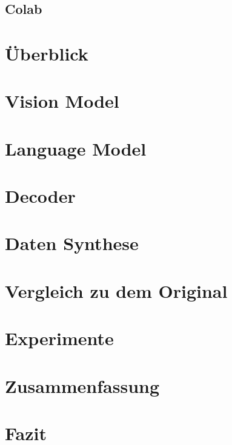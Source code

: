 \documentclass[pdftex,a4paper,halfparskip]{scrartcl}
\begin{document}
\subsection{Colab}
\section{Überblick}
\section{Vision Model}
\section{Language Model}
\section{Decoder}
\section{Daten Synthese}
\section{Vergleich zu dem Original}
\section{Experimente}
\section{Zusammenfassung}
\section{Fazit}


 
\end{document}
